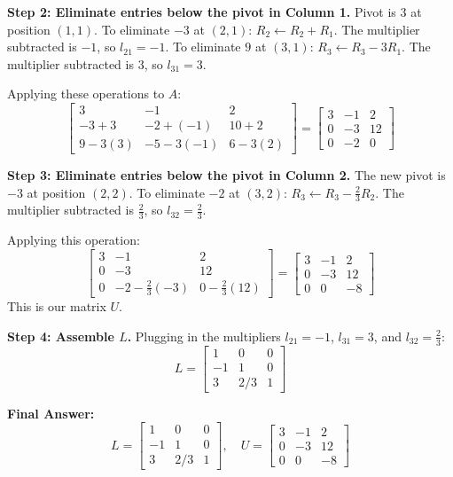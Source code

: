 \documentclass[11pt]{article}
\begin{document}
\textbf{Step 2: Eliminate entries below the pivot in Column 1.}
Pivot is $3$ at position $(1,1)$.
To eliminate $-3$ at $(2,1)$: $R_2 \leftarrow R_2 + R_1$. The multiplier subtracted is $-1$, so $l_{21} = -1$.
To eliminate $9$ at $(3,1)$: $R_3 \leftarrow R_3 - 3R_1$. The multiplier subtracted is $3$, so $l_{31} = 3$.

Applying these operations to $A$:
\[ \begin{bmatrix} 3 & -1 & 2 \\ -3+3 & -2+(-1) & 10+2 \\ 9-3(3) & -5-3(-1) & 6-3(2) \end{bmatrix} = \begin{bmatrix} 3 & -1 & 2 \\ 0 & -3 & 12 \\ 0 & -2 & 0 \end{bmatrix} \]

\textbf{Step 3: Eliminate entries below the pivot in Column 2.}
The new pivot is $-3$ at position $(2,2)$.
To eliminate $-2$ at $(3,2)$: $R_3 \leftarrow R_3 - \frac{2}{3}R_2$. The multiplier subtracted is $\frac{2}{3}$, so $l_{32} = \frac{2}{3}$.

Applying this operation:
\[ \begin{bmatrix} 3 & -1 & 2 \\ 0 & -3 & 12 \\ 0 & -2 - \frac{2}{3}(-3) & 0 - \frac{2}{3}(12) \end{bmatrix} = \begin{bmatrix} 3 & -1 & 2 \\ 0 & -3 & 12 \\ 0 & 0 & -8 \end{bmatrix} \]
This is our matrix $U$.

\textbf{Step 4: Assemble $L$.}
Plugging in the multipliers $l_{21} = -1$, $l_{31} = 3$, and $l_{32} = \frac{2}{3}$:
\[ L = \begin{bmatrix} 1 & 0 & 0 \\ -1 & 1 & 0 \\ 3 & 2/3 & 1 \end{bmatrix} \]

\textbf{Final Answer:}
\[ L = \begin{bmatrix} 1 & 0 & 0 \\ -1 & 1 & 0 \\ 3 & 2/3 & 1 \end{bmatrix}, \quad U = \begin{bmatrix} 3 & -1 & 2 \\ 0 & -3 & 12 \\ 0 & 0 & -8 \end{bmatrix} \]
\end{document}
